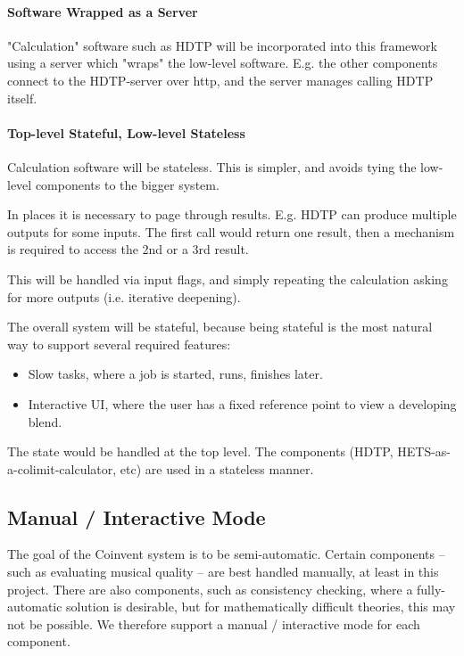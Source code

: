 \documentclass[a4paper,twoside,11pt]{article}
\begin{document}
\paragraph{Software Wrapped as a Server}

"Calculation" software such as HDTP will be incorporated into this framework using a server which "wraps" the low-level software. E.g. the other components connect to the HDTP-server over http, and the server manages calling HDTP itself.


\paragraph{Top-level Stateful, Low-level Stateless}

Calculation software will be stateless. This is simpler, and avoids tying the
low-level components to the bigger system.

In places it is necessary to page through results.
E.g. HDTP can produce multiple outputs for some inputs.
The first call would return one result, then a mechanism is required to access the 2nd or a 3rd result.

This will be handled via input flags, and simply repeating
the calculation asking for more outputs (i.e. iterative deepening).

The overall system will be stateful, because being stateful is the
most natural way to support several required features:
\begin{itemize}
\item Slow tasks, where a job is started, runs, finishes later.
\item Interactive UI, where the user has a fixed reference point to view
a developing blend.
\end{itemize}
The state would be handled at the top level. The components
(HDTP, HETS-as-a-colimit-calculator, etc) are used in a stateless manner.


\subsection{Manual / Interactive Mode}

The goal of the Coinvent system is to be semi-automatic. 
Certain components -- such as evaluating musical quality -- are best handled manually, at least
in this project. There are also components, such as consistency checking, where a fully-automatic solution is desirable, but for mathematically difficult theories, this may not be possible.
We therefore support a manual / interactive mode for each component.
\end{document}
